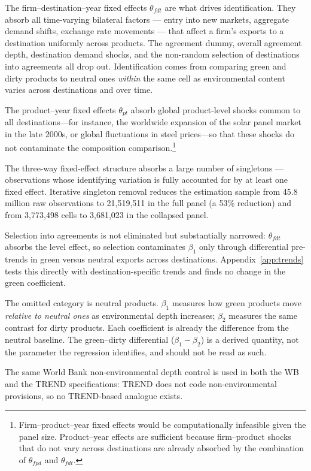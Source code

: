 \documentclass[12pt]{article}
\begin{document}
The firm--destination--year fixed effects $\theta_{fdt}$ are what drives
identification. They absorb all time-varying bilateral factors --- entry into new markets, aggregate demand shifts, exchange rate movements --- that affect a firm's exports to a destination uniformly across products. The agreement dummy, overall agreement depth, destination demand shocks, and the non-random selection of destinations into agreements all drop out. Identification comes from comparing green and dirty products to neutral ones \emph{within} the same cell as environmental content varies across destinations and over time.

The product--year fixed effects $\theta_{pt}$ absorb global product-level shocks
common to all destinations---for instance, the worldwide expansion of the solar
panel market in the late 2000s, or global fluctuations in steel prices---so that
these shocks do not contaminate the composition comparison.\footnote{Firm--product--year fixed effects would be computationally infeasible given the panel size. Product--year effects are sufficient because firm--product shocks that do not vary across destinations are already absorbed by the combination of $\theta_{fpd}$ and $\theta_{fdt}$.}

The three-way fixed-effect structure absorbs a large number of singletons
--- observations whose identifying variation is fully accounted for by at
least one fixed effect.  Iterative singleton removal
\citep{correia2017} reduces the estimation sample from 45.8 million
raw observations to 21,519,511 in the full panel (a 53\% reduction)
and from 3,773,498 cells to 3,681,023 in the collapsed panel.

Selection into agreements is not eliminated but substantially narrowed: $\theta_{fdt}$ absorbs the level effect, so selection contaminates $\beta_1$ only through differential pre-trends in green versus neutral exports across destinations. Appendix~\ref{app:trends} tests this directly with destination-specific trends and finds no change in the green coefficient.

The omitted category is neutral products. $\beta_1$ measures how green products
move \emph{relative to neutral ones} as environmental depth increases; $\beta_2$
measures the same contrast for dirty products. Each coefficient is already the
difference from the neutral baseline. The green--dirty differential
($\beta_1 - \beta_2$) is a derived quantity, not the parameter the regression
identifies, and should not be read as such.

The same World Bank non-environmental depth control is used in both the WB and the TREND specifications: TREND does not code non-environmental provisions, so no TREND-based analogue exists.
\end{document}
